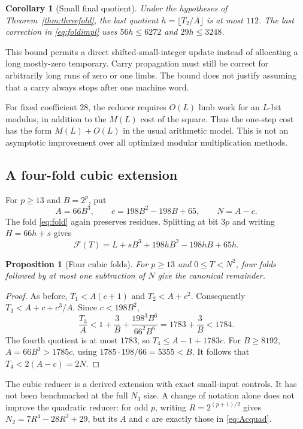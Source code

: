 \documentclass[11pt,a4paper]{article}
\newtheorem{proposition}[theorem]{Proposition}
\newtheorem{corollary}[theorem]{Corollary}
\theoremstyle{definition}
\begin{document}
\begin{corollary}[Small final quotient]\label{cor:smalllast}
Under the hypotheses of Theorem~\ref{thm:threefold}, the last quotient
$h=\lfloor T_2/A\rfloor$ is at most $112$. The last correction in
\eqref{eq:foldimpl} uses $56h\le6272$ and $29h\le3248$.
\end{corollary}

This bound permits a direct shifted-small-integer update instead of allocating
a long mostly-zero temporary. Carry propagation must still be correct for
arbitrarily long runs of zero or one limbs. The bound does not justify
assuming that a carry always stops after one machine word.

For fixed coefficient $28$, the reducer requires $O(L)$ limb work for an
$L$-bit modulus, in addition to the $M(L)$ cost of the square. Thus the
one-step cost has the form $M(L)+O(L)$ in the usual arithmetic model.
This is not an asymptotic improvement over all optimized modular
multiplication methods.

\subsection{A four-fold cubic extension}

For $p\ge13$ and $B=2^p$, put
\[
 A=66B^3,\qquad c=198B^2-198B+65,\qquad N=A-c.
\]
The fold \eqref{eq:fold} again preserves residues. Splitting at bit $3p$
and writing $H=66h+s$ gives
\[
 \mathcal F(T)=L+sB^3+198hB^2-198hB+65h.
\]

\begin{proposition}[Four cubic folds]\label{prop:fourfold}
For $p\ge13$ and $0\le T<N^2$, four folds followed by at most one
subtraction of $N$ give the canonical remainder.
\end{proposition}

\begin{proof}
As before, $T_1<A(c+1)$ and $T_2<A+c^2$. Consequently
$T_3<A+c+c^3/A$. Since $c<198B^2$,
\[
 \frac{T_3}{A}<1+\frac{3}{B}
    +\frac{198^3B^6}{66^2B^6}
   =1783+\frac3B<1784.
\]
The fourth quotient is at most $1783$, so
$T_4\le A-1+1783c$. For $B\ge8192$,
$A=66B^3>1785c$, using $1785\cdot198/66=5355<B$.
It follows that $T_4<2(A-c)=2N$.
\end{proof}

The cubic reducer is a derived extension with exact small-input controls.
It has not been benchmarked at the full $N_3$ size. A change of notation
alone does not improve the quadratic reducer: for odd $p$, writing
$R=2^{(p+1)/2}$ gives $N_2=7R^4-28R^2+29$, but its $A$ and $c$ are
exactly those in \eqref{eq:Acquad}.
\end{document}
